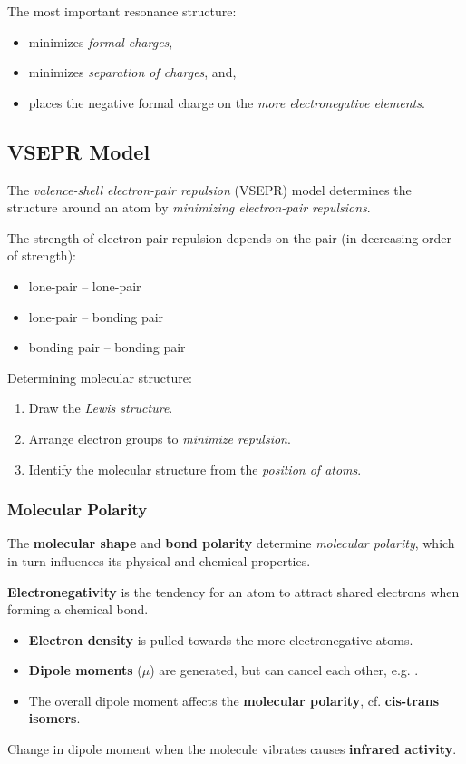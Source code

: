 The most important resonance structure:
\begin{itemize}
    \item minimizes \textit{formal charges},
    \item minimizes \textit{separation of charges}, and,
    \item places the negative formal charge on the \textit{more electronegative elements}.
\end{itemize}


\subsection{VSEPR Model}
The \textit{valence-shell electron-pair repulsion} (VSEPR) model determines the structure
around an atom by \textit{minimizing electron-pair repulsions}.

The strength of electron-pair repulsion depends on the pair (in decreasing order of strength):
\begin{itemize}
    \item lone-pair -- lone-pair
    \item lone-pair -- bonding pair
    \item bonding pair -- bonding pair
\end{itemize}

Determining molecular structure:
\begin{enumerate}[leftmargin=*]
    \item Draw the \textit{Lewis structure}.
    \item Arrange electron groups to \textit{minimize repulsion}.
    \item Identify the molecular structure from the \textit{position of atoms}.
\end{enumerate}

\subsubsection{Molecular Polarity}
The \textbf{molecular shape} and \textbf{bond polarity} determine \textit{molecular polarity},
which in turn influences its physical and chemical properties.

\textbf{Electronegativity} is the tendency for an atom to attract shared electrons when forming
a chemical bond.

\begin{itemize}[label=\(\implies\)]
    \item \textbf{Electron density} is pulled towards the more electronegative atoms.
    \item \textbf{Dipole moments} (\(\mu\)) are generated, but can cancel each other, e.g. .
    \item The overall dipole moment affects the \textbf{molecular polarity}, cf. \textbf{cis-trans isomers}.
\end{itemize}

Change in dipole moment when the molecule vibrates causes \textbf{infrared activity}.